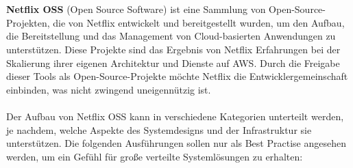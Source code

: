 \documentclass[../vs-script-first-v01.tex]{subfiles}
\begin{document}
\\\\
\textbf{Netflix OSS} (Open Source Software) ist eine Sammlung von Open-Source-Projekten, die von Netflix entwickelt und bereitgestellt wurden, um den Aufbau, die Bereitstellung und das Management von Cloud-basierten Anwendungen zu unterstützen. Diese Projekte sind das Ergebnis von Netflix Erfahrungen bei der Skalierung ihrer eigenen Architektur und Dienste auf AWS. Durch die Freigabe dieser Tools als Open-Source-Projekte möchte Netflix die Entwicklergemeinschaft einbinden, was nicht zwingend uneigennützig ist.
\\\\
Der Aufbau von Netflix OSS kann in verschiedene Kategorien unterteilt werden, je nachdem, welche Aspekte des Systemdesigns und der Infrastruktur sie unterstützen. Die folgenden Ausführungen sollen nur als Best Practise angesehen werden, um ein Gefühl für große verteilte Systemlösungen zu erhalten:
\end{document}
